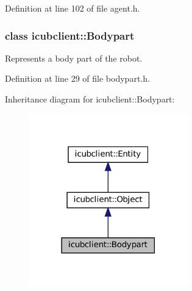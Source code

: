 Definition at line 102 of file agent.\+h.

\label{classicubclient_1_1Bodypart}
\subsubsection{class icubclient\+:\+:Bodypart}
Represents a body part of the robot. 

Definition at line 29 of file bodypart.\+h.



Inheritance diagram for icubclient\+:\+:Bodypart\+:
\nopagebreak
\begin{figure}[H]
\begin{center}
\leavevmode
\includegraphics[width=194pt]{classicubclient_1_1Bodypart__inherit__graph}
\end{center}
\end{figure}
